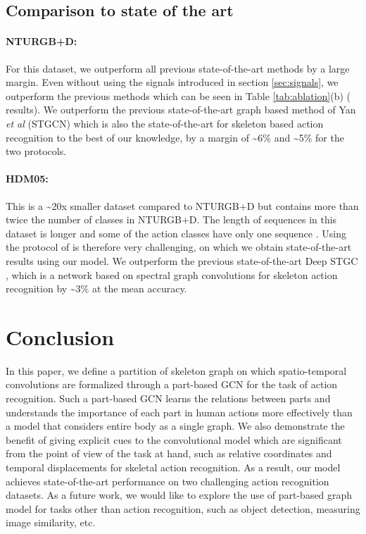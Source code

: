 \documentclass{bmvc2k}
\def\etal{\emph{et al}\bmvaOneDot}
\begin{document}
\subsection{Comparison to state of the art}
\label{sec:5_3}
\paragraph{\textsc{NTURGB+D}:} For this dataset, we outperform all previous state-of-the-art methods by a large margin. Even without using the signals introduced in section \ref{sec:signals}, we outperform the previous methods which can be seen in Table \ref{tab:ablation}(b) ( results). We outperform the previous state-of-the-art graph based method of Yan \etal \cite{yan2018spatial} (STGCN) which is also the state-of-the-art for skeleton based action recognition to the best of our knowledge, by a margin of \textasciitilde6\% and \textasciitilde5\% for the two protocols.

\paragraph{\textsc{HDM05}:} This is a \textasciitilde20x smaller dataset compared to NTURGB+D but contains more than twice the number of classes in NTURGB+D. The length of sequences in this dataset is longer and some of the action classes have only one sequence \cite{Cho2014ClassifyingAV}. Using the protocol of \cite{huang2017riemannian} is therefore very challenging, on which we obtain state-of-the-art results using our model. We outperform the previous state-of-the-art Deep STGC \cite{li2018spatio}, which is a network based on spectral graph convolutions for skeleton action recognition by \textasciitilde3\% at the mean accuracy.
\section{Conclusion}
\label{sec:conclusion}
In this paper, we define a partition of skeleton graph on which spatio-temporal convolutions are formalized through a part-based GCN for the task of action recognition. Such a part-based GCN learns the relations between parts and understands the importance of each part in human actions more effectively than a model that considers entire body as a single graph. We also demonstrate the benefit of giving explicit cues to the convolutional model which are significant from the point of view of the task at hand, such as relative coordinates and temporal displacements for skeletal action recognition. As a result, our model achieves state-of-the-art performance on two challenging action recognition datasets. As a future work, we would like to explore the use of part-based graph model for tasks other than action recognition, such as object detection, measuring image similarity, etc.


\end{document}
